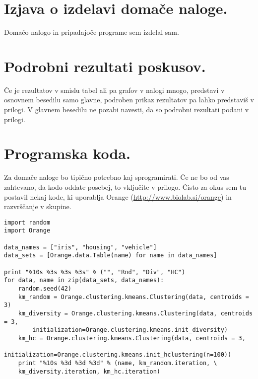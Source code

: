 \documentclass[a4paper,11pt]{article}
\begin{document}
\section{Izjava o izdelavi domače naloge.}
Domačo nalogo in pripadajoče programe sem izdelal sam.

\appendix
\appendixpage
\section{\label{app-res}Podrobni rezultati poskusov.}

Če je rezultatov v smislu tabel ali pa grafov v nalogi mnogo,
predstavi v osnovnem besedilu samo glavne, podroben prikaz
rezultatov pa lahko predstaviš v prilogi. V glavnem besedilu ne
pozabi navesti, da so podrobni rezultati podani v prilogi.

\section{\label{app-code}Programska koda.}

Za domače naloge bo tipično potrebno kaj sprogramirati. Če ne bo od
vas zahtevano, da kodo oddate posebej, to vključite v prilogo. Čisto
za okus sem tu postavil nekaj kode, ki uporablja Orange
(\url{http://www.biolab.si/orange}) in razvrščanje v skupine.


\begin{lstlisting}
import random
import Orange

data_names = ["iris", "housing", "vehicle"]
data_sets = [Orange.data.Table(name) for name in data_names]

print "%10s %3s %3s %3s" % ("", "Rnd", "Div", "HC")
for data, name in zip(data_sets, data_names):
    random.seed(42)
    km_random = Orange.clustering.kmeans.Clustering(data, centroids = 3)
    km_diversity = Orange.clustering.kmeans.Clustering(data, centroids = 3,
        initialization=Orange.clustering.kmeans.init_diversity)
    km_hc = Orange.clustering.kmeans.Clustering(data, centroids = 3,
        initialization=Orange.clustering.kmeans.init_hclustering(n=100))
    print "%10s %3d %3d %3d" % (name, km_random.iteration, \
    km_diversity.iteration, km_hc.iteration)
\end{lstlisting}
\end{document}
